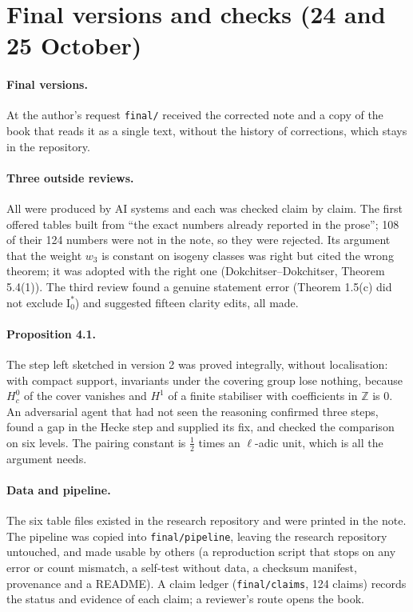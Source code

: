 \documentclass[11pt,a4paper]{article}
\newcommand{\Z}{\mathbb Z}\newcommand{\Q}{\mathbb Q}
\begin{document}
\section{Final versions and checks (24 and 25 October)}
\paragraph{Final versions.} At the author's request \texttt{final/} received the corrected note and a copy of the book that reads it as a single text, without the history of corrections, which stays in the repository.

\paragraph{Three outside reviews.} All were produced by AI systems and each was checked claim by claim. The first offered tables built from ``the exact numbers already reported in the prose''; 108 of their 124 numbers were not in the note, so they were rejected. Its argument that the weight $w_3$ is constant on isogeny classes was right but cited the wrong theorem; it was adopted with the right one (Dokchitser--Dokchitser, Theorem 5.4(1)). The third review found a genuine statement error (Theorem 1.5(c) did not exclude $\mathrm I_0^*$) and suggested fifteen clarity edits, all made.

\paragraph{Proposition 4.1.} The step left sketched in version 2 was proved integrally, without localisation: with compact support, invariants under the covering group lose nothing, because $H^0_c$ of the cover vanishes and $H^1$ of a finite stabiliser with coefficients in $\Z$ is $0$. An adversarial agent that had not seen the reasoning confirmed three steps, found a gap in the Hecke step and supplied its fix, and checked the comparison on six levels. The pairing constant is $\frac12$ times an $\ell$-adic unit, which is all the argument needs.

\paragraph{Data and pipeline.} The six table files existed in the research repository and were printed in the note. The pipeline was copied into \texttt{final/pipeline}, leaving the research repository untouched, and made usable by others (a reproduction script that stops on any error or count mismatch, a self-test without data, a checksum manifest, provenance and a README). A claim ledger (\texttt{final/claims}, 124 claims) records the status and evidence of each claim; a reviewer's route opens the book.
\end{document}
